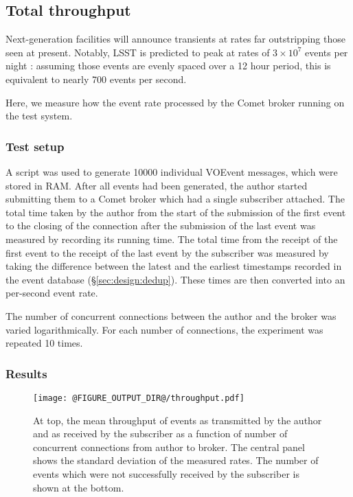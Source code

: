 \documentclass[5p,authoryear]{elsarticle}
\begin{document}
\subsection{Total throughput}
\label{sec:perf:total}

Next-generation facilities will announce transients at rates far outstripping
those seen at present. Notably, LSST is predicted to peak at rates of
$3\times10^7$ events per night \citep{Kantor:2014}: assuming those events are
evenly spaced over a 12 hour period, this is equivalent to nearly 700 events
per second.

Here, we measure how the event rate processed by the Comet broker running on
the test system.

\subsubsection{Test setup}
\label{sec:perf:total:setup}

A script was used to generate 10000 individual VOEvent messages, which were
stored in RAM. After all events had been generated, the author started
submitting them to a Comet broker which had a single subscriber attached. The
total time taken by the author from the start of the submission of the first
event to the closing of the connection after the submission of the last event
was measured by recording its running time. The total time from the receipt of
the first event to the receipt of the last event by the subscriber was
measured by taking the difference between the latest and the earliest
timestamps recorded in the event database (\S\ref{sec:design:dedup}). These
times are then converted into an per-second event rate.

The number of concurrent connections between the author and the broker was
varied logarithmically. For each number of connections, the experiment was
repeated 10 times.

\subsubsection{Results}
\label{sec:perf:total:results}

\begin{figure}
  \begin{center}
  \texttt{[image: @FIGURE\_OUTPUT\_DIR@/throughput.pdf]}
  \end{center}

  \caption{At top, the mean throughput of events as transmitted by
  the author and as received by the subscriber as a function of number of
  concurrent connections from author to broker. The central panel shows the
  standard deviation of the measured rates. The number of events which were
  not successfully received by the subscriber is shown at the bottom.}

  \label{fig:throughput}
\end{figure}
\end{document}

